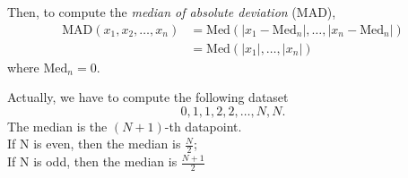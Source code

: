 \documentclass{article} %
\begin{document}
Then, to compute the {\it median of absolute deviation} (MAD), 
\begin{align*}
\text{MAD}(x_1, x_2, \ldots, x_n)&  = \text{Med}\left( |x_1 - \text{Med}_n|, \ldots, |x_n - \text{Med}_n|\right) \\
& = \text{Med}\left( |x_1|, \ldots, |x_n|\right)
\end{align*}
where 
$\text{Med}_n = 0$. 

Actually, we have to compute the following dataset
$$
0, 1, 1, 2, 2, \ldots, N, N. 
$$
The median is the $(N+1)$-th datapoint. \\
If N is even, then the median is $\frac{N}{2}$; \\
If N is odd, then the median is $\frac{N+1}{2}$ \\
\end{document}
